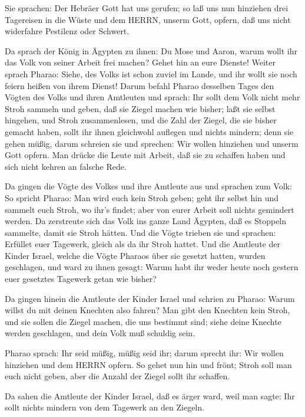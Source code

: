  Sie sprachen: Der Hebräer Gott hat uns gerufen; so laß uns
nun hinziehen drei Tagereisen in die Wüste und dem HERRN, unserm Gott,
opfern, daß uns nicht widerfahre Pestilenz oder Schwert.

 Da sprach der König in Ägypten zu ihnen: Du Mose und Aaron,
warum wollt ihr das Volk von seiner Arbeit frei machen? Gehet hin an
eure Dienste!  Weiter sprach Pharao: Siehe, des Volks ist
schon zuviel im Lande, und ihr wollt sie noch feiern heißen von ihrem
Dienst!  Darum befahl Pharao desselben Tages den Vögten des
Volks und ihren Amtleuten und sprach:  Ihr sollt dem Volk
nicht mehr Stroh sammeln und geben, daß sie Ziegel machen wie bisher;
laßt sie selbst hingehen, und Stroh zusammenlesen,  und die
Zahl der Ziegel, die sie bisher gemacht haben, sollt ihr ihnen
gleichwohl auflegen und nichts mindern; denn sie gehen müßig, darum
schreien sie und sprechen: Wir wollen hinziehen und unserm Gott opfern.
 Man drücke die Leute mit Arbeit, daß sie zu schaffen haben
und sich nicht kehren an falsche Rede.

 Da gingen die Vögte des Volkes und ihre Amtleute aus und
sprachen zum Volk: So spricht Pharao: Man wird euch kein Stroh geben;
 geht ihr selbst hin und sammelt euch Stroh, wo ihr's
findet; aber von eurer Arbeit soll nichts gemindert werden.
 Da zerstreute sich das Volk ins ganze Land Ägypten, daß es
Stoppeln sammelte, damit sie Stroh hätten.  Und die Vögte
trieben sie und sprachen: Erfüllet euer Tagewerk, gleich als da ihr
Stroh hattet.  Und die Amtleute der Kinder Israel, welche
die Vögte Pharaos über sie gesetzt hatten, wurden geschlagen, und ward
zu ihnen gesagt: Warum habt ihr weder heute noch gestern euer gesetztes
Tagewerk getan wie bisher?

 Da gingen hinein die Amtleute der Kinder Israel und
schrien zu Pharao: Warum willst du mit deinen Knechten also fahren?
 Man gibt den Knechten kein Stroh, und sie sollen die
Ziegel machen, die uns bestimmt sind; siehe deine Knechte werden
geschlagen, und dein Volk muß schuldig sein.

 Pharao sprach: Ihr seid müßig, müßig seid ihr; darum
sprecht ihr: Wir wollen hinziehen und dem HERRN opfern.  So
gehet nun hin und frönt; Stroh soll man euch nicht geben, aber die
Anzahl der Ziegel sollt ihr schaffen.

 Da sahen die Amtleute der Kinder Israel, daß es ärger
ward, weil man sagte: Ihr sollt nichts mindern von dem Tagewerk an den
Ziegeln.

